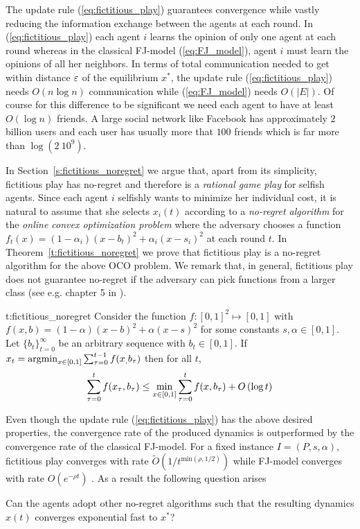 The update rule (\ref{eq:fictitious_play}) guarantees convergence
while vastly reducing the information exchange between the agents
at each round. In (\ref{eq:fictitious_play}) each agent $i$ learns the opinion of only one agent
at each round whereas in the classical FJ-model (\ref{eq:FJ_model}), agent $i$ must
learn the opinions of all her neighbors. In terms of
total communication needed to get within distance $\varepsilon$ of the
equilibrium $x^*$, the update rule (\ref{eq:fictitious_play}) needs
$O(n \log n)$ communication while (\ref{eq:FJ_model}) needs
$O(|E|)$. Of course for this difference to be significant we need
each agent to have at least $O(\log n)$ friends. A large social
network like Facebook has approximately $2$ billion users and each user
has usually more that $100$ friends which is far more than $\log(2\ 10^9)$.

In Section~\ref{s:fictitious_noregret} we argue that, 
apart from its simplicity, fictitious play has no-regret
and therefore is a \emph{rational game play} for selfish agents.
Since each agent $i$ selfishly wants to minimize her individual cost,
it is natural to assume that she selects $x_i(t)$ according to
a \emph{no-regret algorithm} for the \emph{online convex optimization problem}
where the adversary chooses a function $f_t(x)=(1-\alpha_i)(x-b_t)^2 + \alpha_i(x-s_i)^2$
at each round $t$. In Theorem~\ref{t:fictitious_noregret} 
we prove that fictitious play is a no-regret algorithm 
for the above OCO problem. We remark that, in general,
fictitious play does not guarantee no-regret if the adversary can pick
functions from a larger class (see e.g. chapter 5 in \cite{Haz16}).

\begin{reptheorem}{t:fictitious_noregret}
  Consider the function $f:[0,1]^2 \mapsto [0,1]$ with
  $f(x,b) = (1-\alpha)(x-b)^2 + \alpha(x-s)^2$ for some
  constants $s,\alpha \in [0,1]$.
  Let $\{b_t\}_{t=0}^\infty$ be an arbitrary sequence with
  $b_t \in [0,1]$. If $x_t = \operatorname*{argmin}_{x \in [0,1]}\sum_{\tau=0}^{t-1}f(x_,b_\tau)$
  then for all $t$,
  \[
    \sum_{\tau=0}^{t}f(x_\tau,b_\tau) \leq
    \min_{x \in [0,1]}\sum_{\tau=0}^tf(x,b_\tau) + O\left(\log t\right)
  \]
\end{reptheorem}

Even though the update rule (\ref{eq:fictitious_play}) has the above
desired properties, the convergence rate of the produced dynamics is
outperformed by the convergence rate of the classical FJ-model. For
a fixed instance $I=(P,s,\alpha)$, fictitious play converges with rate
$\widetilde{O}(1/t^{\text{min}(\rho,1/2)})$ while FJ-model
converges with rate $O(e^{-\rho t})$ \cite{GS14}.
As a result the following question arises
\begin{question}
  Can the agents adopt other no-regret algorithms such that the resulting
  dynamics $x(t)$ converges exponential fast to $x^*$?
\end{question}


